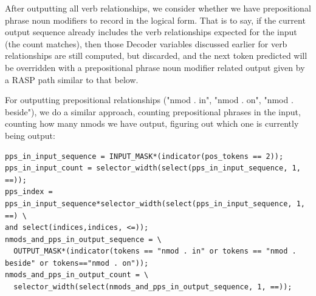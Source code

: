 \documentclass[11pt]{article}
\begin{document}
\clearpage
After outputting all verb relationships, we consider whether we have prepositional phrase noun modifiers to record in the logical form.
That is to say, if the current output sequence already includes the verb relationships expected for the input (the count matches), 
then those Decoder variables discussed earlier for verb relationships are still computed, but discarded,
and the next token predicted will be overridden with a prepositional phrase noun modifier related output given by a RASP path similar to that below.

For outputting prepositional relationships ("nmod . in", "nmod . on", "nmod . beside"), we do a similar approach, counting prepositional phrases in the input, counting how many nmods we have output, figuring out which one is currently being output:

\begin{tiny}
\begin{verbatim}
pps_in_input_sequence = INPUT_MASK*(indicator(pos_tokens == 2));
pps_in_input_count = selector_width(select(pps_in_input_sequence, 1, ==));
pps_index = pps_in_input_sequence*selector_width(select(pps_in_input_sequence, 1, ==) \
and select(indices,indices, <=));
nmods_and_pps_in_output_sequence = \
  OUTPUT_MASK*(indicator(tokens == "nmod . in" or tokens == "nmod . beside" or tokens=="nmod . on"));
nmods_and_pps_in_output_count = \
  selector_width(select(nmods_and_pps_in_output_sequence, 1, ==));
\end{verbatim}
\end{tiny}
\end{document}
